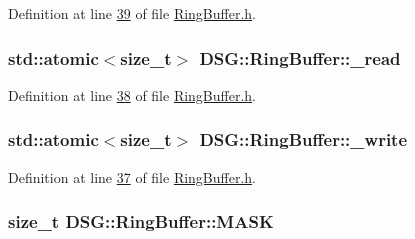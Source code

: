 Definition at line \hyperlink{_ring_buffer_8h_source_l00039}{39} of file \hyperlink{_ring_buffer_8h_source}{Ring\+Buffer.\+h}.

\hypertarget{class_d_s_g_1_1_ring_buffer_aa71bb75a5d24700be795a30e1a135a54}{
\subsubsection[{\+\_\+read}]{\setlength{\rightskip}{0pt plus 5cm}std\+::atomic$<$size\+\_\+t$>$ D\+S\+G\+::\+Ring\+Buffer\+::\+\_\+read\hspace{0.3cm}{\ttfamily [protected]}}}\label{class_d_s_g_1_1_ring_buffer_aa71bb75a5d24700be795a30e1a135a54}


Definition at line \hyperlink{_ring_buffer_8h_source_l00038}{38} of file \hyperlink{_ring_buffer_8h_source}{Ring\+Buffer.\+h}.

\hypertarget{class_d_s_g_1_1_ring_buffer_a78bd7704fd059b745bc82421e1062123}{
\subsubsection[{\+\_\+write}]{\setlength{\rightskip}{0pt plus 5cm}std\+::atomic$<$size\+\_\+t$>$ D\+S\+G\+::\+Ring\+Buffer\+::\+\_\+write\hspace{0.3cm}{\ttfamily [protected]}}}\label{class_d_s_g_1_1_ring_buffer_a78bd7704fd059b745bc82421e1062123}


Definition at line \hyperlink{_ring_buffer_8h_source_l00037}{37} of file \hyperlink{_ring_buffer_8h_source}{Ring\+Buffer.\+h}.

\hypertarget{class_d_s_g_1_1_ring_buffer_a2fba2ff6ee3886101f0f58b0fd7f3641}{
\subsubsection[{M\+A\+S\+K}]{\setlength{\rightskip}{0pt plus 5cm}size\+\_\+t D\+S\+G\+::\+Ring\+Buffer\+::\+M\+A\+S\+K\hspace{0.3cm}{\ttfamily [protected]}}}\label{class_d_s_g_1_1_ring_buffer_a2fba2ff6ee3886101f0f58b0fd7f3641}


